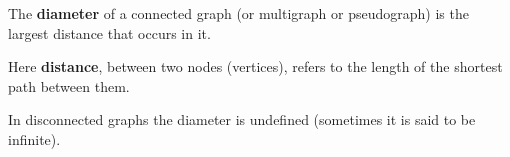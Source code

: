 \documentclass[12pt]{article}
\begin{document}

The {\bf diameter} of a connected graph (or multigraph or pseudograph) is the largest distance that occurs in it.

Here {\bf distance}, between two nodes (vertices), refers to the length of the shortest path between them.

In disconnected graphs the diameter is undefined (sometimes it is said to be infinite).
\end{document}
